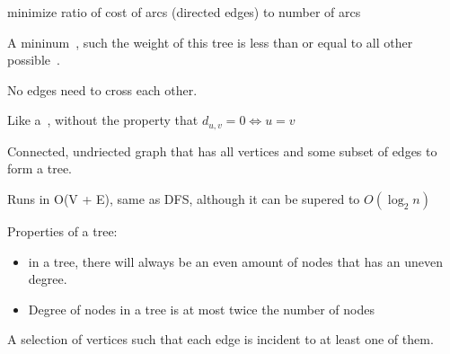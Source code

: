 \begin{definition}
    minimize ratio of cost of arcs (directed edges) to number of arcs
\end{definition}

\begin{definition}[MST]
    A mininum~, such the weight of this tree is less than
    or equal to all other possible~.
\end{definition}

\begin{definition}
    No edges need to cross each other.
\end{definition}

\begin{definition}\label{semimetric}
    Like a~, without the property that
    $d_{u,v} = 0 \iff u = v$
\end{definition}


\begin{definition}\label{spantree}
    Connected, undriected graph that has all vertices and some subset
    of edges to form a tree.
\end{definition}

\begin{definition}\label{topsort}
    Runs in O(V + E), same as DFS, although it can be supered to $O(\log_{2} n)$
\end{definition}

\begin{definition}[Tree]\label{tree}
    Properties of a tree:
    \begin{itemize}
        \item in a tree, there will always be an even amount of nodes that has
            an uneven degree.
        \item Degree of nodes in a tree is at most twice the number of nodes
    \end{itemize}
\end{definition}



\begin{definition}
    A selection of vertices such that each edge is incident to at least one
    of them.
\end{definition}

